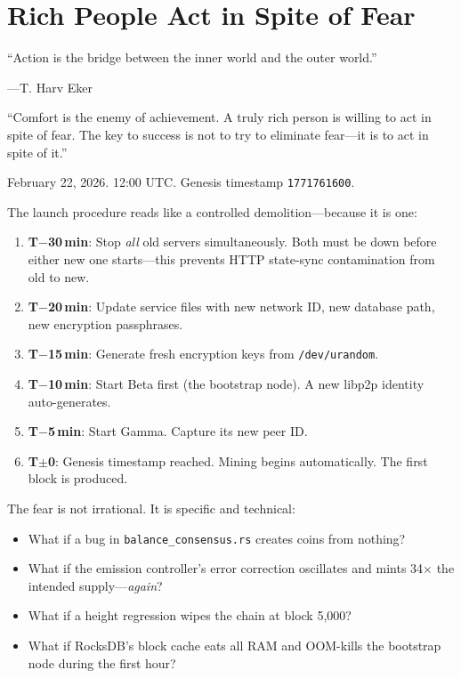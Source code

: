 \documentclass[11pt,a4paper]{article}
\begin{document}
\section{Rich People Act in Spite of Fear}

\epigraph{``Action is the bridge between the inner world and the
outer world.''}%
{---T. Harv Eker}

\begin{wealthbox}[title={\raisebox{-0.5pt}{\tiny$\bigstar$} Wealth File \#9}]
``Comfort is the enemy of achievement. A truly rich person is willing
to act in spite of fear. The key to success is not to try to eliminate
fear---it is to act in spite of it.''
\end{wealthbox}

\vspace{0.3cm}

February 22, 2026. 12:00 UTC. Genesis timestamp \texttt{1771761600}.

The launch procedure reads like a controlled demolition---because it
is one:

\begin{enumerate}[leftmargin=2em]
    \item \textbf{T$-$30\,min}: Stop \emph{all} old servers
          simultaneously. Both must be down before either new one
          starts---this prevents HTTP state-sync contamination from old
          to new.
    \item \textbf{T$-$20\,min}: Update service files with new network ID,
          new database path, new encryption passphrases.
    \item \textbf{T$-$15\,min}: Generate fresh encryption keys from
          \texttt{/dev/urandom}.
    \item \textbf{T$-$10\,min}: Start Beta first (the bootstrap node).
          A new libp2p identity auto-generates.
    \item \textbf{T$-$5\,min}: Start Gamma. Capture its new peer ID.
    \item \textbf{T$\pm$0}: Genesis timestamp reached. Mining begins
          automatically. The first block is produced.
\end{enumerate}

The fear is not irrational. It is specific and technical:

\begin{itemize}[leftmargin=2em]
    \item What if a bug in \texttt{balance\_consensus.rs} creates coins
          from nothing?
    \item What if the emission controller's error correction oscillates
          and mints 34$\times$ the intended supply---\emph{again}?
    \item What if a height regression wipes the chain at block 5{,}000?
    \item What if RocksDB's block cache eats all RAM and OOM-kills the
          bootstrap node during the first hour?
\end{itemize}
\end{document}

